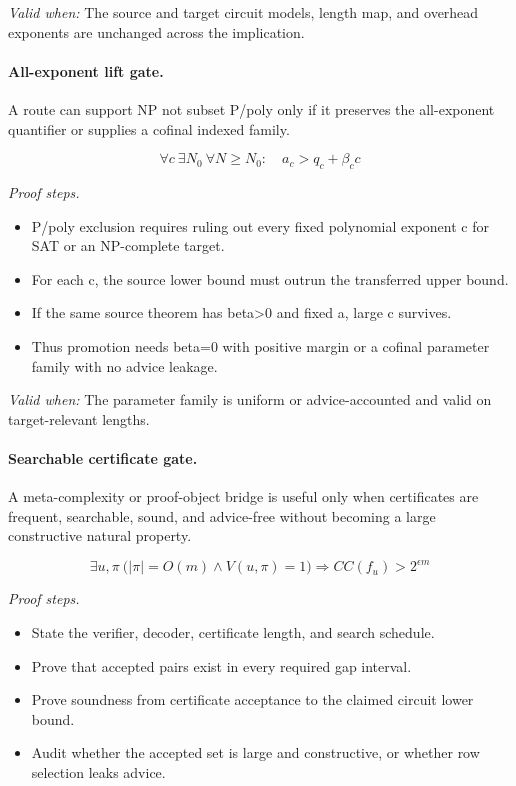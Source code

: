 \emph{Valid when:} The source and target circuit models, length map, and overhead exponents are unchanged across the implication.

\paragraph{All-exponent lift gate.} A route can support NP not subset P/poly only if it preserves the all-exponent quantifier or supplies a cofinal indexed family.

\[
\forall c\ \exists N_0\ \forall N\ge N_0:\quad a_c>q_c+\beta_c c
\]

\emph{Proof steps.}

\begin{itemize}
\item P/poly exclusion requires ruling out every fixed polynomial exponent c for SAT or an NP-complete target.
\item For each c, the source lower bound must outrun the transferred upper bound.
\item If the same source theorem has beta>0 and fixed a, large c survives.
\item Thus promotion needs beta=0 with positive margin or a cofinal parameter family with no advice leakage.
\end{itemize}

\emph{Valid when:} The parameter family is uniform or advice-accounted and valid on target-relevant lengths.

\paragraph{Searchable certificate gate.} A meta-complexity or proof-object bridge is useful only when certificates are frequent, searchable, sound, and advice-free without becoming a large constructive natural property.

\[
\exists u,\pi\ \bigl(|\pi|=O(m)\wedge V(u,\pi)=1\bigr)\Rightarrow CC(f_u)>2^{\epsilon m}
\]

\emph{Proof steps.}

\begin{itemize}
\item State the verifier, decoder, certificate length, and search schedule.
\item Prove that accepted pairs exist in every required gap interval.
\item Prove soundness from certificate acceptance to the claimed circuit lower bound.
\item Audit whether the accepted set is large and constructive, or whether row selection leaks advice.
\end{itemize}

